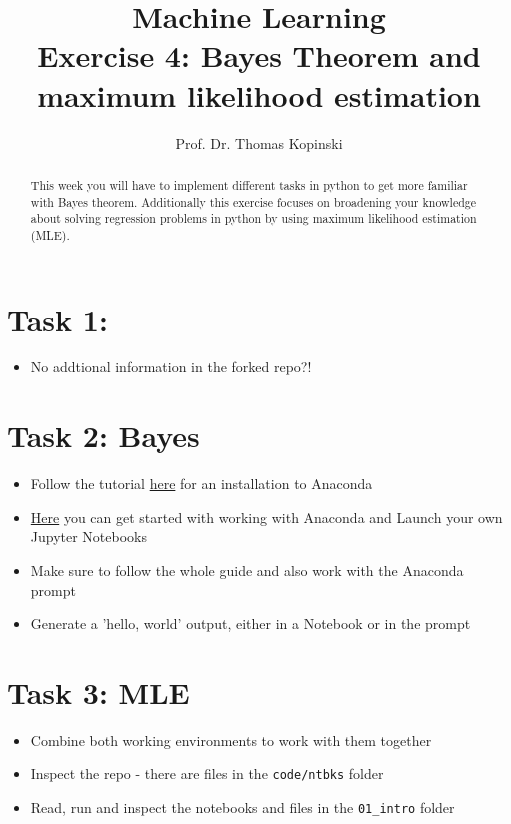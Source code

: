 \documentclass{article}
\title{Machine Learning \\ Exercise 4: Bayes Theorem and maximum likelihood estimation}
\author{Prof. Dr. Thomas Kopinski}
\begin{document}
\maketitle

\begin{abstract}
This week you will have to implement different tasks in python to get more familiar with Bayes theorem. Additionally this exercise focuses on broadening your knowledge about solving regression problems in python by using maximum likelihood estimation (MLE). 
\end{abstract}

\section*{Task 1:}

\begin{itemize}
    \item No addtional information in the forked repo?!
\end{itemize}

\section*{Task 2: Bayes}

\begin{itemize}
    \item Follow the tutorial \href{https://docs.anaconda.com/anaconda/install/index.html}{here} for an installation to Anaconda
    \item \href{https://docs.anaconda.com/anaconda/user-guide/getting-started/}{Here} you can get started with working with Anaconda and Launch your own Jupyter Notebooks
    \item Make sure to follow the whole guide and also work with the Anaconda prompt
    \item Generate a 'hello, world' output, either in a Notebook or in the prompt
\end{itemize}

\section*{Task 3: MLE}

\begin{itemize}
    \item Combine both working environments to work with them together
    \item Inspect the repo - there are files in the \verb+code/ntbks+  folder
    \item Read, run and inspect the notebooks and files in the \verb+01_intro+ folder

\end{itemize}

%
%
\end{document}
